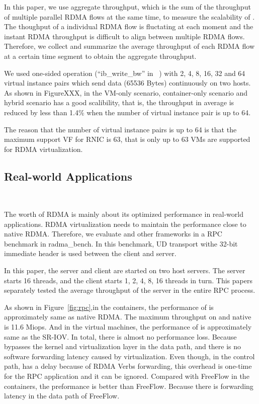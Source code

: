 In this paper, we use aggregate throughput, which is the sum of the throughput of multiple parallel RDMA flows at the same time, to measure the scalability of \sys. The thoughput of a individual RDMA flow is fluctating at each moment and the instant RDMA throughput is difficult to align between multiple RDMA flows. Therefore, we collect and summarize the average throughput of each RDMA flow at a certain time segment to obtain the aggregate throughput.

We used one-sided operation (``ib\_write\_bw'' in ~\cite{perftest}) with 2, 4, 8, 16, 32 and 64 virtual instance pairs which send data (65536 Bytes) continuously on two hosts. As shown in FigureXXX, in the VM-only scenario, container-only scenario and hybrid scenario \sys has a good scalibility, that is, the throughput in average is reduced by less than 1.4\% when the number of virtual instance pair is up to 64.

The reason that the number of virtual instance pairs is up to 64 is that the maximum support VF for RNIC is 63, that is only up to 63 VMs are supported for RDMA virtualization.

\subsection{Real-world Applications}
\
\noindent

The worth of RDMA is mainly about its optimized performance in real-world applications. RDMA virtualization needs to maintain the performance close to native RDMA. Therefore, we evaluate \sys and other frameworks in a RPC benchmark in radma\_bench\cite{rbench}. In this benchmark, UD transport withe 32-bit immediate header is used between the client and server.

In this paper, the server and client are started on two host servers. The server starts 16 threads, and the client starts 1, 2, 4, 8, 16 threads in turn. This papers separately tested the average throughput of the server in the entire RPC process.

As shown in Figure~\ref{fig:rpc},in the containers, the performance of \sys is approximately same as native RDMA. The
maximum throughput on \sys and native is 11.6 Miops. And in the virtual machines, the performance of \sys is approximately same as the SR-IOV. In total, there is almost no performance loss. Because \sys bypasses the kernel and virtualization layer in the data path, and there is no software forwarding latency caused by virtualization. Even though, in the control path, \sys has a delay because of RDMA Verbs forwarding, this overhead is one-time for the RPC application and it can be ignored. Compared with FreeFlow in the containers, the preformance \sys is better than FreeFlow. Because there is forwarding latency in the data path of FreeFlow.


